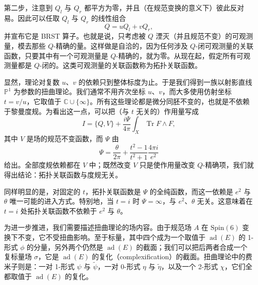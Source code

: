 \documentclass[11pt,a4paper,UTF8]{ctexart}
\begin{document}
第二步，注意到 $Q_{l}$ 与 $Q_{r}$ 都平方为零，并且（在规范变换的意义下）彼此反对易。因此可以任取 $Q_{l}$ 与 $Q_{r}$ 的线性组合
\[
    Q=uQ_{l}+vQ_{r},
\]
并宣布它是 BRST 算子。也就是说，只考虑被 $Q$ 湮灭（并且规范不变）的可观测量，模去那些 $Q$-精确的量。这样做是自洽的，因为任何涉及 $Q$-闭可观测量的关联函数，只要其中有一个可观测量是 $Q$-精确的，就为零。从现在起，假定所有可观测量都是 $Q$-闭的。这类可观测量的关联函数称为拓扑关联函数。

显然，理论对复数 $u$、$v$ 的依赖只到整体标度为止。于是我们得到一族以射影直线 $\mathbb{P}^{1}$ 为参数的扭曲理论。我们通常不用齐次坐标 $u$、$v$，而大多使用仿射坐标 $t=v/u$，它取值于 $\mathbb{C}\cup\{\infty\}$。所有这些理论都是微分同胚不变的，也就是不依赖于黎曼度规。为看出这一点，可以把（与 $t$ 无关的）作用量写成
\[
    I=\{Q,V\}+\frac{i\Psi}{4\pi}\int_{X}\operatorname{Tr}F\wedge F,
\]
其中 $V$ 是场的规范不变函数，而 $\Psi$ 由
\[
    \Psi=\frac{\theta}{2\pi}+\frac{t^{2}-1}{t^{2}+1}\frac{4\pi i}{e^{2}}
\]
给出。全部度规依赖都在 $V$ 中；既然改变 $V$ 只是使作用量改变 $Q$-精确项，我们就得出结论：拓扑关联函数与度规无关。

同样明显的是，对固定的 $t$，拓扑关联函数是 $\Psi$ 的全纯函数，而这一依赖是 $e^{2}$ 与 $\theta$ 唯一可能的进入方式。特别地，当 $t=i$ 时 $\Psi=\infty$，与 $e^{2}$、$\theta$ 无关。这意味着在 $t=i$ 处拓扑关联函数不依赖于 $e^{2}$ 与 $\theta$。

为进一步推进，我们需要描述扭曲理论的场内容。由于规范场 $A$ 在 $\mathrm{Spin}(6)$ 变换下不变，它不受扭曲影响。至于标量，其中四个成为一个取值于 $\operatorname{ad}(E)$ 的 1-形式 $\phi$ 的分量，另外两个仍然是 $\operatorname{ad}(E)$ 的截面；我们可以把后两者合成一个复标量场 $\sigma$，它是 $\operatorname{ad}(E)$ 的复化（complexification）的截面。扭曲理论中的费米子则是：一对 1-形式 $\psi$ 与 $\tilde{\psi}$，一对 0-形式 $\eta$ 与 $\tilde{\eta}$，以及一个 2-形式 $\chi$，它们全都取值于 $\operatorname{ad}(E)$ 的复化。
\end{document}
